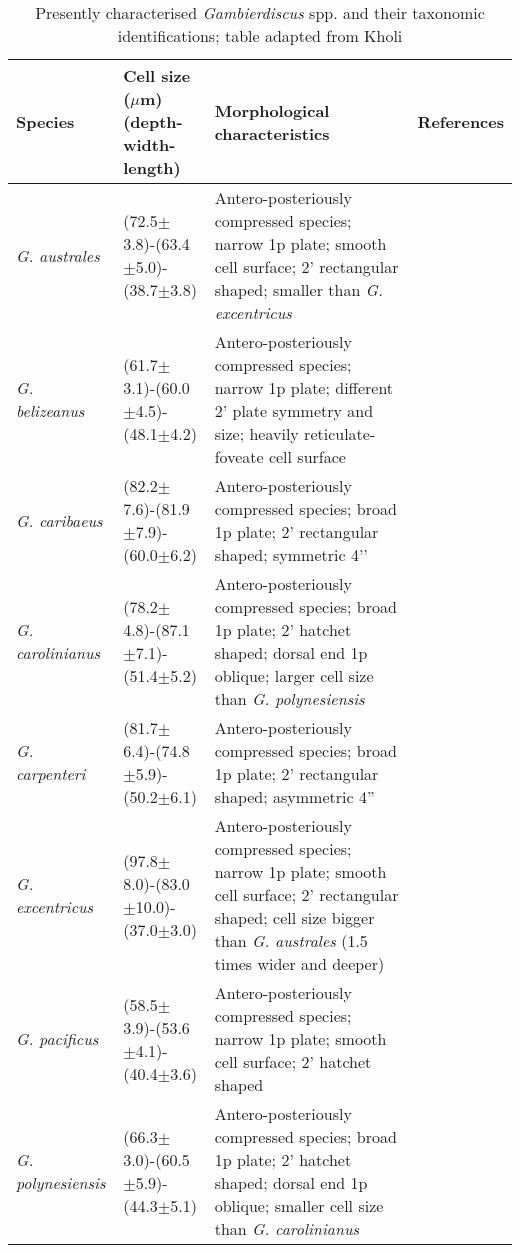 \documentclass[12pt]{article}
\begin{document}
\begin{longtable}{ |  p{1.6cm} | p{2.5cm} | p{6.7cm} |  p{3.2cm} | }
\caption{Presently characterised \emph{Gambierdiscus} spp. and their taxonomic identifications; table adapted from Kholi \cite{kohli2013Gambierdiscus}}\\
\hline
\label{tbl:MorphTable}
\textbf{Species} & \textbf{Cell size ($\mu$m) (depth-width-length)} & \textbf{Morphological characteristics} & \textbf{References} \\
\hline
 \emph{G. australes} & (72.5$\pm$3.8)-(63.4$\pm$5.0)-(38.7$\pm$3.8) & Antero-posteriously compressed species; narrow 1p plate; smooth cell surface; 2' rectangular shaped; smaller than \emph{G. excentricus} &  \cite{chinain1999morphology,litaker2009taxonomy} \\
\hline
 \emph{G. belizeanus} & (61.7$\pm$3.1)-(60.0$\pm$4.5)-(48.1$\pm$4.2) & Antero-posteriously compressed species; narrow 1p plate; different 2' plate symmetry and size; heavily reticulate-foveate cell surface & \cite{litaker2009taxonomy,faust1995observation} \\
\hline
 \emph{G. caribaeus} & (82.2$\pm$7.6)-(81.9$\pm$7.9)-(60.0$\pm$6.2) & Antero-posteriously compressed species; broad 1p plate; 2’ rectangular shaped; symmetric 4’’  & \cite{litaker2009taxonomy} \\
\hline
 \emph{G. carolinianus} & (78.2$\pm$4.8)-(87.1$\pm$7.1)-(51.4$\pm$5.2) & Antero-posteriously compressed species; broad 1p plate; 2’ hatchet shaped; dorsal end 1p oblique; larger cell size than \emph{G. polynesiensis}  & \cite{litaker2009taxonomy} \\
\hline
 \emph{G. carpenteri} & (81.7$\pm$6.4)-(74.8$\pm$5.9)-(50.2$\pm$6.1) & Antero-posteriously compressed species; broad 1p plate; 2’ rectangular shaped; asymmetric 4''   & \cite{litaker2009taxonomy} \\
\hline
  \emph{G. excentricus} & (97.8$\pm$8.0)-(83.0$\pm$10.0)-(37.0$\pm$3.0) & Antero-posteriously compressed species; narrow 1p plate; smooth cell surface; 2’ rectangular shaped; cell size bigger than \emph{G. australes} (1.5 times wider and deeper)   & \cite{litaker2009taxonomy} \\
\hline
  \emph{G. pacificus} & (58.5$\pm$3.9)-(53.6$\pm$4.1)-(40.4$\pm$3.6) & Antero-posteriously compressed species; narrow 1p plate; smooth cell surface; 2' hatchet shaped   & \cite{litaker2009taxonomy,chinain1999morphology} \\
\hline
 \emph{G. polynesiensis} & (66.3$\pm$3.0)-(60.5$\pm$5.9)-(44.3$\pm$5.1) & Antero-posteriously compressed species; broad 1p plate; 2’ hatchet shaped; dorsal end 1p oblique; smaller cell size than \emph{G. carolinianus}   & \cite{litaker2009taxonomy,chinain1999morphology} \\

\end{longtable}
\end{document}
